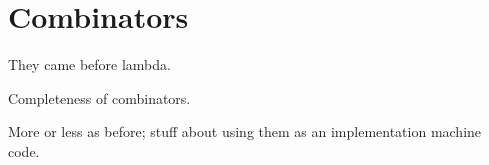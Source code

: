 \chapter{Combinators}

They came before lambda.

Completeness of combinators.

More or less as before; stuff about using them as an implementation machine
code.
